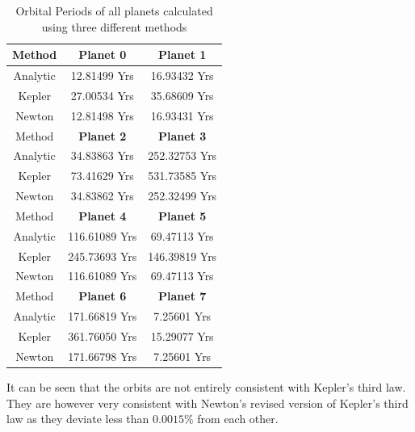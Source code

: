 \documentclass[reprint,english,notitlepage]{revtex4-2}
\begin{document}
\begin{table}[h]
    \begin{tabular}{ |c|c|c| }
        \hline
		Method & \textbf{Planet 0} & \textbf{Planet 1}\\
		\hline
        Analytic	& 12.81499 Yrs & 16.93432 Yrs\\
		Kepler		& 27.00534 Yrs & 35.68609 Yrs\\
		Newton		& 12.81498 Yrs & 16.93431 Yrs\\
		\hline\hline
		Method & \textbf{Planet 2} & \textbf{Planet 3}\\
		\hline
        Analytic	& 34.83863 Yrs & 252.32753 Yrs\\
		Kepler		& 73.41629 Yrs & 531.73585 Yrs\\
		Newton		& 34.83862 Yrs & 252.32499 Yrs\\
		\hline\hline
		Method & \textbf{Planet 4} & \textbf{Planet 5}\\
		\hline
        Analytic	& 116.61089 Yrs & 69.47113 Yrs\\
		Kepler		& 245.73693 Yrs & 146.39819 Yrs\\
		Newton		& 116.61089 Yrs & 69.47113 Yrs\\
		\hline\hline
		Method & \textbf{Planet 6} & \textbf{Planet 7}\\
		\hline
        Analytic	& 171.66819 Yrs & 7.25601 Yrs\\
		Kepler		& 361.76050 Yrs & 15.29077 Yrs\\
		Newton		& 171.66798 Yrs & 7.25601 Yrs\\
		\hline
	\end{tabular}
    \caption{Orbital Periods of all planets calculated using three different methods}
    \label{tab:Kepler3_Table}
\end{table}


It can be seen that the orbits are not entirely consistent with Kepler's third law.
They are however very consistent with Newton's revised version of Kepler's third law as they deviate less than $0.0015\%$ from each other.
\end{document}
